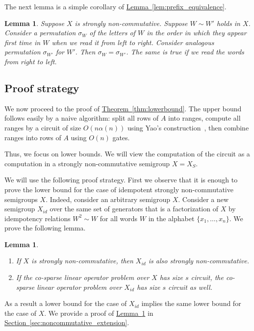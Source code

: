 \documentclass[11pt]{article}
\numberwithin{equation}{section}
\newtheorem{lemma}[theorem]{Lemma}
\theoremstyle{definition}
\theoremstyle{plain}
\newcommand{\expref}[2]{\hyperref[#2]{#1~\ref{#2}}}
\theoremstyle{plain}\newtheorem{observation}[theorem]{Observation}
\begin{document}
The next lemma is a simple corollary of \expref{Lemma}{lem:prefix_equivalence}.
\begin{lemma} \label{lem:variables_order}
Suppose $X$ is strongly non-commutative. Suppose $W \sim W'$ holds in $X$. Consider a permutation $\sigma_W$ of the letters of $W$ in the order in which they appear first time in $W$ when we read it from left to right. Consider analogous permutation $\sigma_{W'}$ for $W'$. Then $\sigma_W = \sigma_{W'}$.
%
The same is true if we read the words from right to left.

\end{lemma}

\subsection{Proof strategy}


We now proceed to the proof of \expref{Theorem}{thm:lowerbound}. The upper bound
follows easily by a naive algorithm: split all rows of $A$ into ranges, compute
all ranges by a circuit of size $O(n\alpha(n))$ using Yao's
construction~\cite{DBLP:conf/stoc/Yao82}, then combine ranges into rows of $A$
using $O(n)$ gates.

Thus, we focus on lower bounds. We will view the computation of the circuit as a
computation in a strongly non-commutative semigroup $X=X_S$.

We will use the following proof strategy. First we observe that it is enough to
prove the lower bound for the case of idempotent strongly non-commutative
semigroups $X$. Indeed,
consider an arbitrary semigroup $X$. Consider a new semigroup $X_{id}$ over the same set of generators that is a factorization of $X$ by idempotency relations $W^2\sim W$ for all words $W$ in the alphabet $\{x_1,\ldots, x_n\}$.
%
We prove the following lemma.
\begin{lemma} \label{lem:idempotent_is_hardest}
	\begin{enumerate}
\item If $X$ is strongly non-commutative, then $X_{id}$ is also strongly non-commutative.
		\item If the
        co-sparse
        linear operator problem over $X$ has size $s$
		circuit, the
        co-sparse
        linear operator problem over $X_{id}$ has size
		$s$ circuit as well.
	\end{enumerate}
\end{lemma}
As a result a lower bound for the case of $X_{id}$ implies the same lower bound for the case of $X$.
We provide a proof of \expref{Lemma}{lem:idempotent_is_hardest} in
\expref{Section}{sec:noncommutative_extension}.
\end{document}
